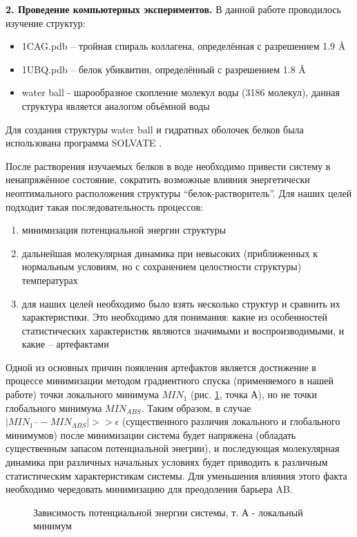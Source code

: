 \documentclass[a4paper]{article}
\begin{document}
\textbf{2. Проведение компьютерных экспериментов.} В данной работе проводилось изучение структур:
\begin{itemize}
\item 1CAG.pdb – тройная спираль коллагена, определённая с разрешением 1.9 \AA 
\item 1UBQ.pdb – белок убиквитин, определённый с разрешением 1.8 \AA
\item water ball -  шарообразное скопление молекул воды (3186 молекул), данная структура является аналогом объёмной воды
\end{itemize}

Для создания структуры water ball и гидратных оболочек белков была
использована программа SOLVATE \cite{solvate}.

После растворения изучаемых белков в воде необходимо привести систему в ненапряжённое состояние, сократить возможные влияния энергетически неоптимального расположения структуры “белок-растворитель”.  Для наших целей подходит такая последовательность процессов: 
\begin{enumerate}
\item минимизация потенциальной энергии структуры
\item дальнейшая молекулярная динамика при невысоких (приближенных к нормальным условиям, но с сохранением целостности структуры) температурах
\item для наших целей необходимо было взять несколько структур и сравнить их характеристики. Это необходимо для понимания: какие из особенностей статистических характеристик являются значимыми и воспроизводимыми, и какие – артефактами
\end{enumerate}

Одной из основных причин появления артефактов является достижение в процессе
минимизации методом градиентного спуска (применяемого в нашей работе) точки локального минимума $MIN_1$ (рис. \ref{ris:energy_barrier}, точка А), но не точки глобального минимума $MIN_{ABS}$. Таким образом, в случае $| MIN_1 –- MIN_{ABS} | >> \epsilon$ (существенного различия локального и глобального минимумов) после минимизации система будет напряжена (обладать существенным запасом потенциальной энегрии), и последующая молекулярная динамика при различных начальных условиях будет приводить к различным статистическим характеристикам системы. Для уменьшения влияния этого факта необходимо чередовать минимизацию для преодоления барьера AB.        

\begin{figure}[h]
\caption{ Зависимость потенциальной энергии системы, т. А - локальный минимум}
\label{ris:energy_barrier}
\end{figure}
\end{document}
